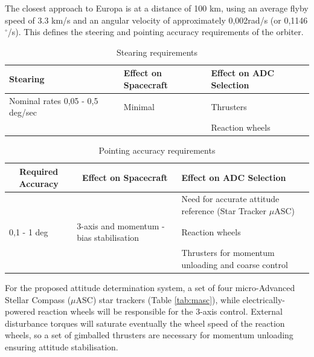 The closest approach to Europa is at a distance of 100 km, using an average flyby speed of 3.3 km/s and an angular velocity of approximately 0,002rad/s (or 0,1146$^{\circ}$/s). This defines the steering and pointing accuracy requirements of the orbiter. 
\begin{table}[htb!]
  \centering
    \begin{tabular}{|p{}|p{}|p{}|}
    \hline
    \textbf{Stearing} & \textbf{Effect on Spacecraft} & \textbf{Effect on ADC Selection} \bigstrut\\
    \hline
    Nominal rates 0,05 - 0,5 deg/sec & Minimal & Thrusters \bigstrut\\
\cline{3-3}          &       & Reaction wheels \bigstrut\\
    \hline
    \end{tabular}%
    \caption{Stearing requirements \cite {spacemissionanalysis}}
  \label{tab:stearing_req}%
\end{table}%

\begin{table}[htb!]
  \centering
    \begin{tabular}{|p{}|p{}|p{}|}
    \hline
    \multicolumn{1}{|c|}{\textbf{Required Accuracy}} & \multicolumn{1}{c|}{\textbf{Effect on Spacecraft}} & \textbf{Effect on ADC Selection} \bigstrut\\
    \hline
          &       & Need for accurate attitude reference (Star Tracker $\mu$ASC) \bigstrut\\
\cline{3-3}    0,1 - 1 deg & 3-axis and momentum - bias stabilisation & Reaction wheels \bigstrut\\
\cline{3-3}          &       & Thrusters for momentum unloading and coarse control \bigstrut\\
    \hline
    \end{tabular}%
    \caption{Pointing accuracy requirements \cite {spacemissionanalysis}}
  \label{tab:point_acc_req}%
\end{table}%
For the proposed attitude determination system, a set of four micro-Advanced Stellar Compass ($\mu$ASC) star trackers (Table \ref{tab:masc}), while electrically-powered reaction wheels will be responsible for the 3-axis control. External disturbance torques will saturate eventually the wheel speed of the reaction wheels, so a set of gimballed thrusters are necessary for momentum unloading ensuring attitude stabilisation.

